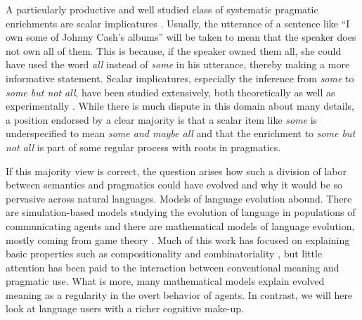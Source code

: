 \documentclass[a4paper, 11pt]{article}
\theoremstyle{Satz}
\begin{document}
A particularly productive and well studied class of systematic pragmatic enrichments are scalar
implicatures
\citep{horn:1984,Hirschberg1985:A-Theory-of-Sca,LevinsonPragmatics1983,Geurts2010:Quantity-Implic}. Usually,
the utterance of a sentence like ``I own some of Johnny Cash's albums'' will be taken to mean
that the speaker does not own all of them. This is because, if the speaker owned them all, she
could have used the word \emph{all} instead of \emph{some} in his utterance, thereby making a
more informative statement. Scalar implicatures, especially the inference from \emph{some} to
\emph{some but not all}, have been studied extensively, both theoretically
\citep[e.g.,][]{Sauerland2004:Scalar-Implicat,ChierchiaFox2008:The-Grammatical,Rooyvan-RooijJagerde-Jager2012:Explaining-Quan}
as well as experimentally
\citep[e.g.,][]{BottNoveck2004:Some-Utterances,huang+snedeker:2009,GrodnerKlein2010:Some-and-Possib,GoodmanStuhlmuller2013:Knowledge-and-I,DegenTanenhaus2012:Processing-Scal}. While
there is much dispute in this domain about many details, a position endorsed by a clear
majority is that a scalar item like \emph{some} is underspecified to mean \emph{some and maybe
  all} and that the enrichment to \emph{some but not all} is part of some regular process with
roots in pragmatics.

If this majority view is correct, the question arises how such a division of labor between
semantics and pragmatics could have evolved and why it would be so pervasive across natural
languages. Models of language evolution abound. There are simulation-based models studying the
evolution of language in populations of communicating agents
\citep{Hurford1989:Biological-Evol,Steels1995:A-Self-Organizi,LenaertsJansen2005:The-Evolutionar,SteelsBelpaeme2005:Coordinating-Pe,BaronchelliPuglisi2008:Cultural-route-,steels:2011,SpikeStadler2016:Minimal-Require}
and there are mathematical models of language evolution, mostly coming from game theory
\citep{lewis:1969,Warneryd1993:Cheap-Talk-Coor,BlumeKim1993:Evolutionary-St,nowak+krakauer:1999,Huttegger2007:Evolution-and-t,Skyrms2010:Signals}. Much
of this work has focused on explaining basic properties such as compositionality and
combinatoriality
\citep[e.g.,][]{Batali1998:Computational-S,nowak+krakauer:1999,nowak+etal:2000,KirbyHurford2002:The-Emergence-o,kirby:2002,SmithKirby2003:Iterated-Learni,Gong2007:Language-Evolut,kirby+etal:2015,verhoef+etal:2014,Franke2015:Proto-Syntax},
but little attention has been paid to the interaction between conventional meaning and
pragmatic use. What is more, many mathematical models explain evolved meaning as a regularity
in the overt behavior of agents. In contrast, we will here look at language users with a richer
cognitive make-up.
\end{document}
